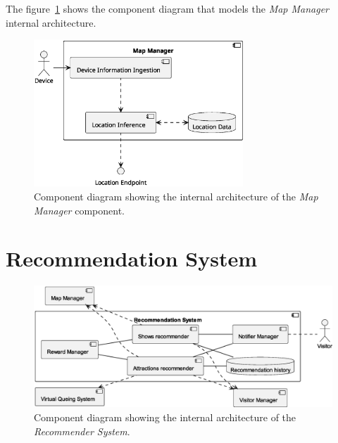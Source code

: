 The figure~\ref{fig:map-manager} shows the component diagram that models the \textit{Map Manager} internal architecture.

\begin{figure}[H]
	\centering
	\includegraphics[width=0.7\textwidth]{img/map-manager-overview.eps}
	\caption{Component diagram showing the internal architecture of the \textit{Map Manager} component.}
	\label{fig:map-manager}
\end{figure}

\section{Recommendation System}

\begin{figure}[H]
	\centering
	\includegraphics[width=\textwidth]{img/recommender.eps}
	\caption{Component diagram showing the internal architecture of the \textit{Recommender System}.
	}
	\label{fig:recommender-arch}
\end{figure}

